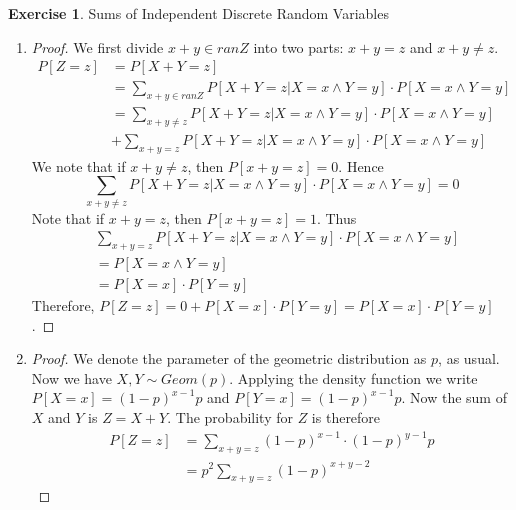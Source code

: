 \documentclass[12pt,a4paper]{article}
\theoremstyle{definition}
\newtheorem{exercise}{Exercise}
\begin{document}
\begin{exercise}
Sums of Independent Discrete Random Variables
\begin{enumerate}[label=\roman*)]
    \item \begin{proof}
        We first divide $x+y\in ranZ$ into two parts: $x+y=z$ and $x+y\neq z$.
        \begin{equation*}
            \begin{split}
                P[Z=z]&=P[X+Y=z]\\
                &=\sum_{x+y\in ranZ} P[X+Y=z|X=x\land Y=y]\cdot P[X=x\land Y=y]\\
                &=\sum_{x+y\neq z} P[X+Y=z|X=x\land Y=y]\cdot P[X=x\land Y=y]\\
                &+\sum_{x+y=z} P[X+Y=z|X=x\land Y=y]\cdot P[X=x\land Y=y]
            \end{split}
        \end{equation*}
        We note that if $x+y\neq z$, then $P[x+y=z]=0$. Hence
        \begin{equation*}
            \sum_{x+y\neq z} P[X+Y=z|X=x\land Y=y]\cdot P[X=x\land Y=y]=0
        \end{equation*}
        Note that if $x+y=z$, then $P[x+y=z]=1$. Thus
        \begin{equation*}
            \begin{split}
                &\sum_{x+y=z} P[X+Y=z|X=x\land Y=y]\cdot P[X=x\land Y=y]\\
                &=P[X=x\land Y=y]\\
                &=P[X=x]\cdot P[Y=y]
            \end{split}
        \end{equation*}
        Therefore, $P[Z=z]=0+P[X=x]\cdot P[Y=y]=P[X=x]\cdot P[Y=y]$.
    \end{proof}
    \item \begin{proof}
        We denote the parameter of the geometric distribution as $p$, as usual. Now we have $X,Y\sim Geom(p)$. Applying the density function we write $P[X=x]=(1-p)^{x-1}p$ and $P[Y=x]=(1-p)^{x-1}p$. Now the sum of $X$ and $Y$ is $Z=X+Y$. The probability for $Z$ is therefore 
        \begin{equation*}
            \begin{split}
                P[Z=z]&=\sum_{x+y=z}(1-p)^{x-1}\cdot (1-p)^{y-1}p\\
                &=p^2\sum_{x+y=z}(1-p)^{x+y-2}
            \end{split}
        \end{equation*}
        

\end{proof}
\end{enumerate}
\end{exercise}
\end{document}
